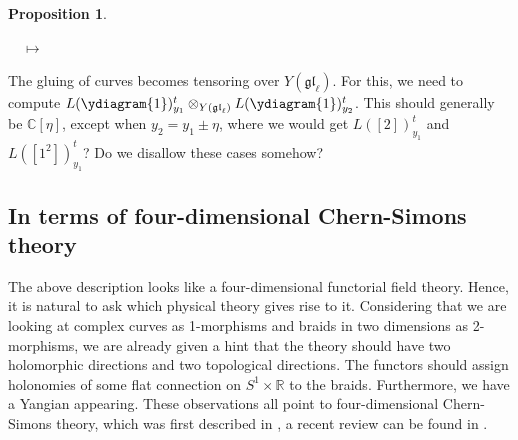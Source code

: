\documentclass[11pt]{report}
\newtheorem{prop}[theorem]{Proposition}
\theoremstyle{definition}
\theoremstyle{remark}
\theoremstyle{remark}
\newcommand{\id}{\textnormal{id}}
\newcommand{\R}{\mathbb{R}}
\newcommand{\C}{\mathbb{C}}
\renewcommand{\P}{\mathbb{P}}
\begin{document}
\begin{prop}
\begin{center}
$\quad \mapsto \quad$
\end{center}
\end{prop}

The gluing of curves becomes tensoring over $Y(\mathfrak{gl}_\ell)$. For this, we need to compute $L(\ydiagram{1})_{y_1}^t \otimes_{Y(\mathfrak{gl}_\ell)} L(\ydiagram{1})_{y_2}^t$. This should generally be $\C[\eta]$, except when $y_2 = y_1 \pm \eta$, where we would get $L([2])_{y_1}^t$ and $L([1^2])_{y_1}^t$? Do we disallow these cases somehow?

\pagebreak

\subsection{In terms of four-dimensional Chern-Simons theory}

The above description looks like a four-dimensional functorial field theory. Hence, it is natural to ask which physical theory gives rise to it. Considering that we are looking at complex curves as 1-morphisms and braids in two dimensions as 2-morphisms, we are already given a hint that the theory should have two holomorphic directions and two topological directions. The functors should assign holonomies of some flat connection on $S^1 \times \R$ to the braids. Furthermore, we have a Yangian appearing. These observations all point to four-dimensional Chern-Simons theory, which was first described in \cite{article:costello:2013}, a recent review can be found in \cite{article:lacroix:2022}.
\end{document}
